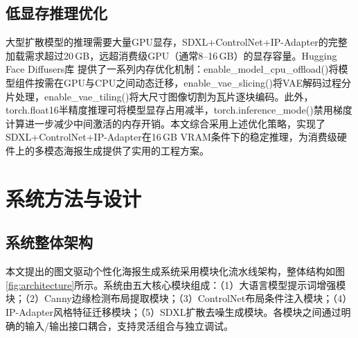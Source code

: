 \documentclass[12pt,a4paper]{ctexart}
\begin{document}
\subsection{低显存推理优化}

大型扩散模型的推理需要大量GPU显存，SDXL+ControlNet+IP-Adapter的完整加载需求超过20\,GB，远超消费级GPU（通常8--16\,GB）的显存容量。Hugging Face Diffusers库\cite{von2023diffusers} 提供了一系列内存优化机制：enable\_model\_cpu\_offload()将模型组件按需在GPU与CPU之间动态迁移，enable\_vae\_slicing()将VAE解码过程分片处理，enable\_vae\_tiling()将大尺寸图像切割为瓦片逐块编码。此外，torch.float16半精度推理可将模型显存占用减半，torch.inference\_mode()禁用梯度计算进一步减少中间激活的内存开销。本文综合采用上述优化策略，实现了SDXL+ControlNet+IP-Adapter在16\,GB VRAM条件下的稳定推理，为消费级硬件上的多模态海报生成提供了实用的工程方案。

\section{系统方法与设计}
\label{sec:method}

\subsection{系统整体架构}

本文提出的图文驱动个性化海报生成系统采用模块化流水线架构，整体结构如图\ref{fig:architecture}所示。系统由五大核心模块组成：（1）大语言模型提示词增强模块；（2）Canny边缘检测布局提取模块；（3）ControlNet布局条件注入模块；（4）IP-Adapter风格特征迁移模块；（5）SDXL扩散去噪生成模块。各模块之间通过明确的输入/输出接口耦合，支持灵活组合与独立调试。
\end{document}
